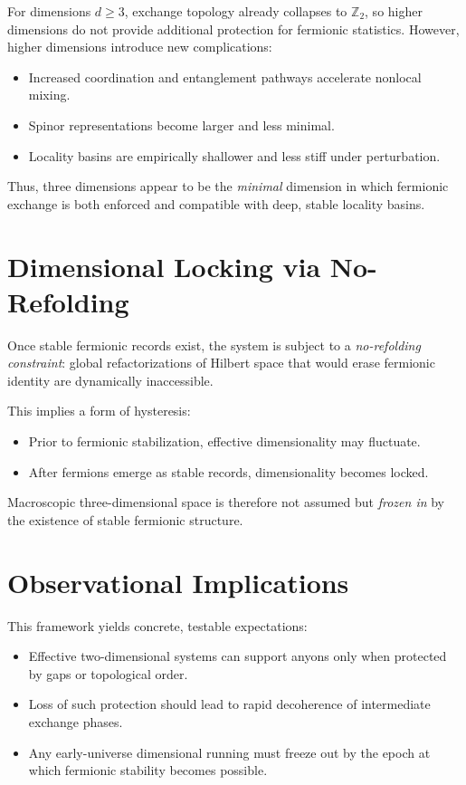\documentclass[11pt]{article}
\begin{document}
For dimensions $d \geq 3$, exchange topology already collapses to $\mathbb{Z}_2$, so higher dimensions do not provide additional protection for fermionic statistics. However, higher dimensions introduce new complications:
\begin{itemize}
    \item Increased coordination and entanglement pathways accelerate nonlocal mixing.
    \item Spinor representations become larger and less minimal.
    \item Locality basins are empirically shallower and less stiff under perturbation.
\end{itemize}

Thus, three dimensions appear to be the \emph{minimal} dimension in which fermionic exchange is both enforced and compatible with deep, stable locality basins.

\section{Dimensional Locking via No-Refolding}

Once stable fermionic records exist, the system is subject to a \emph{no-refolding constraint}: global refactorizations of Hilbert space that would erase fermionic identity are dynamically inaccessible.

This implies a form of hysteresis:
\begin{itemize}
    \item Prior to fermionic stabilization, effective dimensionality may fluctuate.
    \item After fermions emerge as stable records, dimensionality becomes locked.
\end{itemize}

Macroscopic three-dimensional space is therefore not assumed but \emph{frozen in} by the existence of stable fermionic structure.

\section{Observational Implications}

This framework yields concrete, testable expectations:
\begin{itemize}
    \item Effective two-dimensional systems can support anyons only when protected by gaps or topological order.
    \item Loss of such protection should lead to rapid decoherence of intermediate exchange phases.
    \item Any early-universe dimensional running must freeze out by the epoch at which fermionic stability becomes possible.
\end{itemize}
\end{document}
